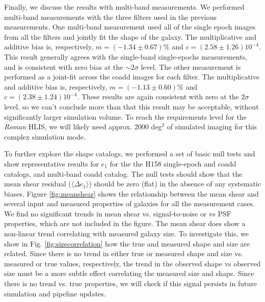 \documentclass[fleqn,usenatbib]{mnras}
\begin{document}
Finally, we discuss the results with multi-band measurements. We performed multi-band measurements with the three filters used in the previous measurements. One multi-band measurement used all of the single epoch images from all the filters and jointly fit the shape of the galaxy. The multiplicative and additive bias is, respectively, $m=(-1.34\pm0.67)$\% and $c=(2.58\pm1.26)10^{-4}$. This result generally agrees with the single-band single-epochs measurements, and is consistent with zero bias at the $\sim$2$\sigma$ level. The other measurement is performed as a joint-fit across the coadd images for each filter. The multiplicative and additive bias is, respectively, $m=(-1.13\pm0.60)\%$ and $c=(2.38\pm1.24)10^{-4}$. These results are again consistent with zero at the 2$\sigma$ level, so we can't conclude more than that this result may be acceptable, without significantly larger simulation volume. To reach the requirements level for the \emph{Roman} HLIS, we will likely need approx. 2000 deg$^{2}$ of simulated imaging for this complex simulation mode. 

To further explore the shape catalogs, we performed a set of basic null tests and show representative results for $e_1$ for the the H158 single-epoch and coadd catalogs, and multi-band coadd catalog. The null tests should show that the mean shear residual ($\langle \Delta e_{1} \rangle$) should be zero (flat) in the absence of any systematic biases. Figure \ref{fig:meanshear} shows the relationship between the mean shear and several input and measured properties of galaxies for all the measurement cases. We find no significant trends in mean shear vs. signal-to-noise or vs PSF properties, which are not included in the figure. The mean shear does show a non-linear trend correlating with measured galaxy size. To investigate this, we show in Fig. \ref{fig:sizecorrelation} how the true and measured shape and size are related. Since there is no trend in either true or measured shape and size vs. measured or true values, respectively, the trend in the observed shape vs observed size must be a more subtle effect correlating the measured size and shape. Since there is no trend vs. true properties, we will check if this signal persists in future simulation and pipeline updates.
\end{document}
